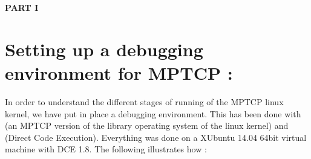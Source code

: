 \documentclass[a4paper,11pt]{article}
\begin{document}
	\clearpage

	\begin{center}
		\LARGE\textbf{PART I}
	\end{center}


	\section{Setting up a debugging environment for MPTCP : }

		\label{sec:mptcpdebug}

		In order to understand the different stages of running of the MPTCP linux kernel, we have put in place a debugging environment. This has been done with \cite[LibOS]{libos} (an MPTCP version of the library operating system of the linux kernel) and \cite[DCE]{dce} (Direct Code Execution). Everything was done on a XUbuntu 14.04 64bit virtual machine with DCE 1.8. The following illustrates how :
\end{document}
